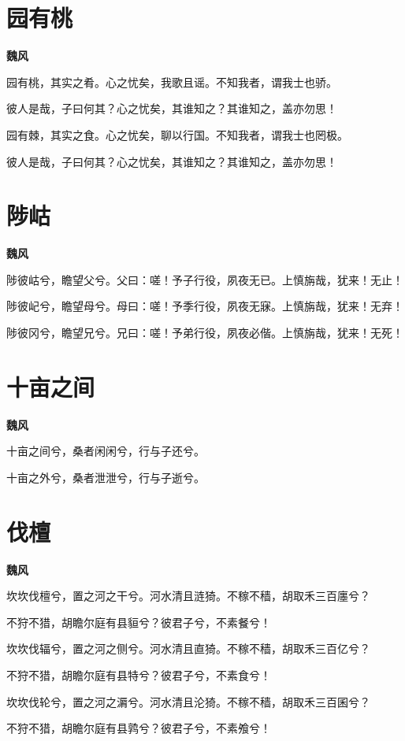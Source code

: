 \documentclass[12pt,a4paper]{ctexbook}
\begin{document}
\section{园有桃}
\textbf{魏风}\par\vspace{0.5em}
园有桃，其实之肴。心之忧矣，我歌且谣。不知我者，谓我士也骄。\par
彼人是哉，子曰何其？心之忧矣，其谁知之？其谁知之，盖亦勿思！\par
园有棘，其实之食。心之忧矣，聊以行国。不知我者，谓我士也罔极。\par
彼人是哉，子曰何其？心之忧矣，其谁知之？其谁知之，盖亦勿思！\par

\section{陟岵}
\textbf{魏风}\par\vspace{0.5em}
陟彼岵兮，瞻望父兮。父曰：嗟！予子行役，夙夜无已。上慎旃哉，犹来！无止！\par
陟彼屺兮，瞻望母兮。母曰：嗟！予季行役，夙夜无寐。上慎旃哉，犹来！无弃！\par
陟彼冈兮，瞻望兄兮。兄曰：嗟！予弟行役，夙夜必偕。上慎旃哉，犹来！无死！\par

\section{十亩之间}
\textbf{魏风}\par\vspace{0.5em}
十亩之间兮，桑者闲闲兮，行与子还兮。\par
十亩之外兮，桑者泄泄兮，行与子逝兮。\par

\section{伐檀}
\textbf{魏风}\par\vspace{0.5em}
坎坎伐檀兮，置之河之干兮。河水清且涟猗。不稼不穑，胡取禾三百廛兮？\par
不狩不猎，胡瞻尔庭有县貆兮？彼君子兮，不素餐兮！\par
坎坎伐辐兮，置之河之侧兮。河水清且直猗。不稼不穑，胡取禾三百亿兮？\par
不狩不猎，胡瞻尔庭有县特兮？彼君子兮，不素食兮！\par
坎坎伐轮兮，置之河之漘兮。河水清且沦猗。不稼不穑，胡取禾三百囷兮？\par
不狩不猎，胡瞻尔庭有县鹑兮？彼君子兮，不素飧兮！\par
\end{document}
